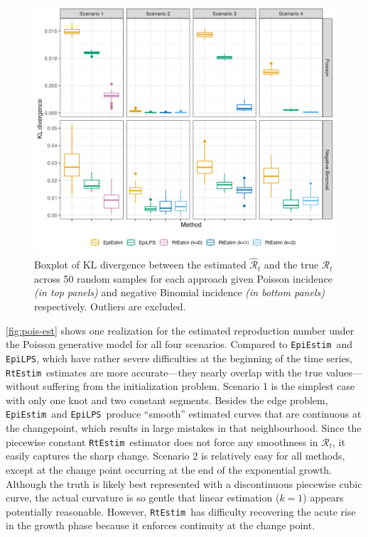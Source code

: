 \documentclass[10pt,letterpaper]{article}
\def\RtEstim{\texttt{RtEstim}}
\def\EpiEstim{\texttt{EpiEstim}}
\def\EpiLPS{\texttt{EpiLPS}}
\def\calR{\mathcal{R}}
\begin{document}
\begin{figure}[!h]
  \centering
  \includegraphics[width=.99\textwidth]{fig/KL_no_outlier.png}
  \caption{Boxplot of KL divergence between the estimated 
  $\hat{\calR}_t$ and the true $\calR_t$ across 50 random samples for 
  each approach given Poisson incidence \textit{(in top panels)} and negative 
  Binomial incidence \textit{(in bottom panels)} respectively.  
  Outliers are excluded.} 
  \label{fig:kl-res}
\end{figure}

\autoref{fig:pois-est} shows one realization for the estimated reproduction
number under the Poisson generative model for all four scenarios. Compared to
\EpiEstim\ and \EpiLPS, which have rather severe difficulties at the beginning
of the time series, \RtEstim\ estimates are more accurate---they nearly
overlap with the true values---without suffering from the initialization
problem. Scenario
1 is the simplest case with only one knot and two constant segments. Besides the
edge problem, \EpiEstim\ and \EpiLPS\ produce ``smooth'' estimated curves that
are continuous at the changepoint, which results in large mistakes in that
neighbourhood. Since the piecewise constant \RtEstim\ estimator does not force
any smoothness in $\calR_t$, it easily captures the sharp change. Scenario 2 is relatively easy for all methods, except at the change
point occurring at the end of the exponential growth. Although the truth is
likely best represented with a discontinuous piecewise cubic curve, the actual
curvature is so gentle that linear estimation ($k=1$) appears potentially
reasonable. However,
\RtEstim\ has difficulty recovering the acute rise in the
growth phase because it enforces continuity at the change point. 
\end{document}
